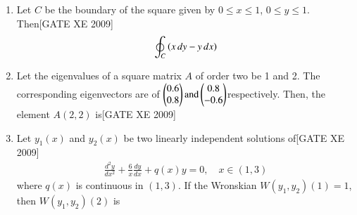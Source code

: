 \documentclass[journal,12pt,onecolumn]{IEEEtran}
\theoremstyle{remark}
\begin{document}
\begin{enumerate}
    \item Let $C$ be the boundary of the square given by $0 \leq x \leq 1$, $0 \leq y \leq 1$. Then\hfill[GATE XE 2009]
    \begin{align*}
 \oint_C \left(x\,dy - y\,dx\right)
    \end{align*}
    
    \begin{enumerate}
   \end{enumerate}    

    \item Let the eigenvalues of a square matrix $A$ of order two be 1 and 2. The corresponding eigenvectors are of $
        \begin{pmatrix} 0.6 \\ 0.8\end{pmatrix}  \text{and}  \begin{pmatrix} 0.8 \\ -0.6 \end{pmatrix}
$respectively. Then, the element $A(2,2)$ is\hfill[GATE XE 2009]
    \begin{enumerate}
  \end{enumerate}      
    
    \item Let $y_1(x)$ and $y_2(x)$ be two linearly independent solutions of\hfill[GATE XE 2009]
    \begin{align*}
        \frac{d^2 y}{dx^2} + \frac{6}{x}\frac{dy}{dx} + q(x)y = 0, \quad x \in (1,3)
   \end{align*}
    where $q(x)$ is continuous in $(1,3)$. If the Wronskian $W(y_1,y_2)(1) = 1$, then $W(y_1,y_2)(2)$ is
    
     \begin{enumerate}
\end{enumerate}      
  

\end{enumerate}
\end{document}
